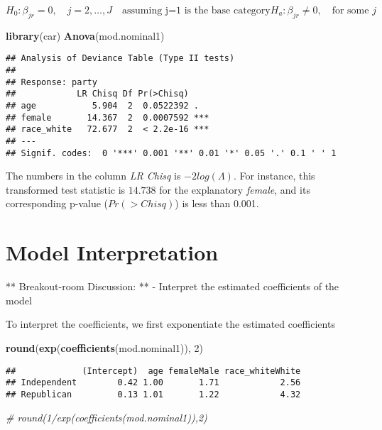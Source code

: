 \documentclass[]{article}
\newenvironment{Shaded}{\begin{snugshade}}{\end{snugshade}}
\newcommand{\KeywordTok}[1]{\textcolor[rgb]{0.13,0.29,0.53}{\textbf{{#1}}}}
\newcommand{\DecValTok}[1]{\textcolor[rgb]{0.00,0.00,0.81}{{#1}}}
\newcommand{\CommentTok}[1]{\textcolor[rgb]{0.56,0.35,0.01}{\textit{{#1}}}}
\newcommand{\NormalTok}[1]{{#1}}
\begin{document}
\[
H_0: \beta_{jr} = 0, \quad j=2,\dots,J \quad \text{assuming j=1 is the base category}
H_a: \beta_{jr} \ne 0, \quad \text{for some } j
\]

\begin{Shaded}
\begin{Highlighting}[]
\KeywordTok{library}\NormalTok{(car)}
\KeywordTok{Anova}\NormalTok{(mod.nominal1)}
\end{Highlighting}
\end{Shaded}

\begin{verbatim}
## Analysis of Deviance Table (Type II tests)
## 
## Response: party
##            LR Chisq Df Pr(>Chisq)    
## age           5.904  2  0.0522392 .  
## female       14.367  2  0.0007592 ***
## race_white   72.677  2  < 2.2e-16 ***
## ---
## Signif. codes:  0 '***' 0.001 '**' 0.01 '*' 0.05 '.' 0.1 ' ' 1
\end{verbatim}

The numbers in the column \emph{LR Chisq} is \(-2log(\Lambda)\). For
instance, this transformed test statistic is \(14.738\) for the
explanatory \emph{female}, and its corresponding p-value
(\(Pr(>Chisq)\)) is less than 0.001.

\section{Model Interpretation}\label{model-interpretation}

** Breakout-room Discussion: ** - Interpret the estimated coefficients
of the model

To interpret the coefficients, we first exponentiate the estimated
coefficients

\begin{Shaded}
\begin{Highlighting}[]
\KeywordTok{round}\NormalTok{(}\KeywordTok{exp}\NormalTok{(}\KeywordTok{coefficients}\NormalTok{(mod.nominal1)), }\DecValTok{2}\NormalTok{)}
\end{Highlighting}
\end{Shaded}

\begin{verbatim}
##             (Intercept)  age femaleMale race_whiteWhite
## Independent        0.42 1.00       1.71            2.56
## Republican         0.13 1.01       1.22            4.32
\end{verbatim}

\begin{Shaded}
\begin{Highlighting}[]
\CommentTok{# round(1/exp(coefficients(mod.nominal1)),2)}
\end{Highlighting}
\end{Shaded}
\end{document}
